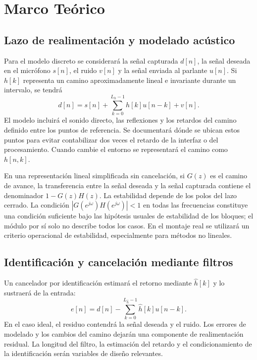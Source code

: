 \section{Marco Teórico}
\subsection{Lazo de realimentación y modelado acústico}
Para el modelo discreto se considerará la señal capturada $d[n]$, la señal deseada en el micrófono $s[n]$, el ruido $v[n]$ y la señal enviada al parlante $u[n]$. Si $h[k]$ representa un camino aproximadamente lineal e invariante durante un intervalo, se tendrá
\begin{equation}
d[n]=s[n]+\sum_{k=0}^{L_h-1}h[k]u[n-k]+v[n].
\label{eq:lazo}
\end{equation}
El modelo incluirá el sonido directo, las reflexiones y los retardos del camino definido entre los puntos de referencia. Se documentará dónde se ubican estos puntos para evitar contabilizar dos veces el retardo de la interfaz o del procesamiento. Cuando cambie el entorno se representará el camino como $h[n,k]$.

En una representación lineal simplificada sin cancelación, si $G(z)$ es el camino de avance, la transferencia entre la señal deseada y la señal capturada contiene el denominador $1-G(z)H(z)$. La estabilidad depende de los polos del lazo cerrado. La condición $|G(e^{j\omega})H(e^{j\omega})|<1$ en todas las frecuencias constituye una condición suficiente bajo las hipótesis usuales de estabilidad de los bloques; el módulo por sí solo no describe todos los casos. En el montaje real se utilizará un criterio operacional de estabilidad, especialmente para métodos no lineales.


\subsection{Identificación y cancelación mediante filtros}
Un cancelador por identificación estimará el retorno mediante $\widehat h[k]$ y lo sustraerá de la entrada:
\begin{equation}
e[n]=d[n]-\sum_{k=0}^{L_{\widehat h}-1}\widehat h[k]u[n-k].
\end{equation}
En el caso ideal, el residuo contendrá la señal deseada y el ruido. Los errores de modelado y los cambios del camino dejarán una componente de realimentación residual. La longitud del filtro, la estimación del retardo y el condicionamiento de la identificación serán variables de diseño relevantes.


